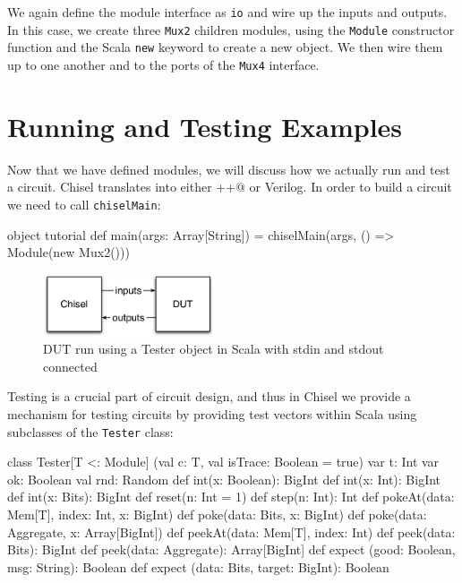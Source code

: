 \documentclass[twocolumn,10pt]{article}
\def\code#1{{\tt #1}}
\begin{document}
\noindent
We again define the module interface as \code{io} and wire up the
inputs and outputs.  In this case, we create three \code{Mux2}
children modules, using the \code{Module} constructor function and 
the Scala \code{new} keyword to create a
new object.  We then wire them up to one another and to the ports of
the \code{Mux4} interface.

\section{Running and Testing Examples}

Now that we have defined modules, we will discuss how we actually run and test a circuit.  Chisel translates into either \verb@C++@ or Verilog.   In order to build a circuit we need to call \code{chiselMain}:

\begin{scala}
object tutorial {
  def main(args: Array[String]) = {
    chiselMain(args, () => Module(new Mux2()))
  }
}
\end{scala}

\begin{figure}
\begin{center}
\includegraphics[width=0.45\textwidth]{../tutorial/figs/DUT.pdf}
\end{center}
\caption{DUT run using a Tester object in Scala with stdin and stdout connected}
\label{fig:dut}
\end{figure}
 
Testing is a crucial part of circuit design, 
and thus in Chisel we provide a mechanism for
testing circuits by providing test vectors within Scala using
subclasses of the \code{Tester} class:

\begin{scala}
class Tester[T <: Module] (val c: T, val isTrace: Boolean = true) {
  var t: Int
  var ok: Boolean
  val rnd: Random
  def int(x: Boolean): BigInt
  def int(x: Int): BigInt
  def int(x: Bits): BigInt
  def reset(n: Int = 1)
  def step(n: Int): Int
  def pokeAt(data: Mem[T], index: Int, x: BigInt)
  def poke(data: Bits, x: BigInt)
  def poke(data: Aggregate, x: Array[BigInt])
  def peekAt(data: Mem[T], index: Int)
  def peek(data: Bits): BigInt
  def peek(data: Aggregate): Array[BigInt]
  def expect (good: Boolean, msg: String): Boolean
  def expect (data: Bits, target: BigInt): Boolean
}
\end{scala}
\end{document}
